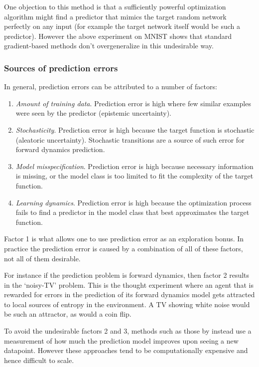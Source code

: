 \documentclass{article} \usepackage[dvipsnames]{xcolor}
\begin{document}
One objection to this method is that a sufficiently powerful optimization algorithm might find a predictor that mimics the target random network perfectly on any input (for example the target network itself would be such a predictor). However the above experiment on MNIST shows that standard gradient-based methods don't overgeneralize in this undesirable way.

\subsubsection{Sources of prediction errors}
\label{sec:prediction_error}In general, prediction errors can be attributed to a number of factors:
\begin{enumerate}
    \item \emph{Amount of training data}. Prediction error is high where few similar examples were seen by the predictor (epistemic uncertainty).
    \item \emph{Stochasticity}. Prediction error is high because the target function is stochastic (aleatoric uncertainty). Stochastic transitions are a source of such error for forward dynamics prediction.
    \item \emph{Model misspecification}. Prediction error is high because necessary information is missing, or the model class is too limited to fit the complexity of the target function.
    \item \emph{Learning dynamics}. Prediction error is high because the optimization process fails to find a predictor in the model class that best approximates the target function.
\end{enumerate}

Factor 1 is what allows one to use prediction error as an exploration bonus. In practice the prediction error is caused by a combination of all of these factors, not all of them desirable.

For instance if the prediction problem is forward dynamics, then factor 2 results in the `noisy-TV' problem. This is the thought experiment where an agent that is rewarded for errors in the prediction of its forward dynamics model gets attracted to local sources of entropy in the environment. A TV showing white noise would be such an attractor, as would a coin flip.

To avoid the undesirable factors 2 and 3, methods such as those by \cite{schmidhuber1991curious,oudeyer2007intrinsic,lopes2012exploration,josh_surprise} instead use a measurement of how much the prediction model improves upon seeing a new datapoint. However these approaches tend to be computationally expensive and hence difficult to scale.
\end{document}
